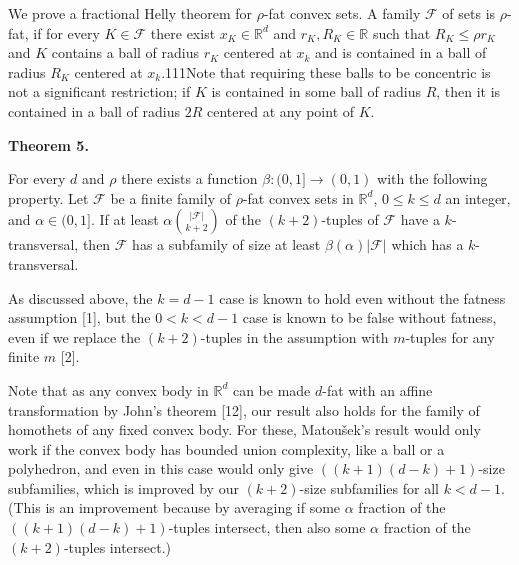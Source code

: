 \par
\par
\par
We prove a fractional Helly theorem for $\rho$-fat convex sets. A family $\mathcal{F}$ of sets is $\rho$-fat, if for every $K\in\mathcal{F}$ there exist $x_{K}\in\mathbb{R}^{d}$ and $r_{K},R_{K}\in\mathbb{R}$ such that $R_{K}\leq\rho r_{K}$ and $K$ contains a ball of radius $r_{K}$ centered at $x_{k}$ and is contained in a ball of radius $R_{K}$ centered at $x_{k}$.111Note that requiring these balls to be concentric is not a significant restriction; if $K$ is contained in some ball of radius $R$, then it is contained in a ball of radius $2R$ centered at any point of $K$.
\par
\par
\par\medskip\noindent\textbf{Theorem 5.}\par
For every $d$ and $\rho$ there exists a function $\beta\colon(0,1]\to(0,1)$ with the following property. Let $\mathcal{F}$ be a finite family of $\rho$-fat convex sets in $\mathbb{R}^{d}$, $0\leq k\leq d$ an integer, and $\alpha\in(0,1]$. If at least $\alpha\binom{|\mathcal{F}|}{k+2}$ of the $(k+2)$-tuples of $\mathcal{F}$ have a $k$-transversal, then $\mathcal{F}$ has a subfamily of size at least $\beta(\alpha)|\mathcal{F}|$ which has a $k$-transversal.
\par
\par
\par
As discussed above, the $k=d-1$ case is known to hold even without the fatness assumption [1], but the $0<k<d-1$ case is known to be false without fatness, even if we replace the $(k+2)$-tuples in the assumption with $m$-tuples for any finite $m$ [2].
\par
\par
Note that as any convex body in $\mathbb{R}^{d}$ can be made $d$-fat with an affine transformation by John’s theorem [12], our result also holds for the family of homothets of any fixed convex body. For these, Matoušek’s result would only work if the convex body has bounded union complexity, like a ball or a polyhedron, and even in this case would only give $((k+1)(d-k)+1)$-size subfamilies, which is improved by our $(k+2)$-size subfamilies for all $k<d-1$. (This is an improvement because by averaging if some $\alpha$ fraction of the $((k+1)(d-k)+1)$-tuples intersect, then also some $\alpha$ fraction of the $(k+2)$-tuples intersect.)

